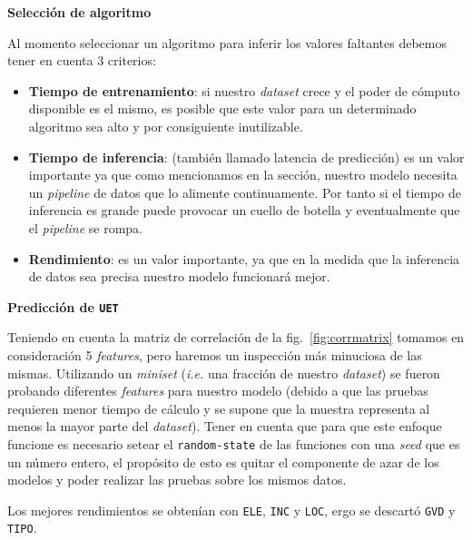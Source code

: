 \documentclass[a4paper,12pt]{article}
\begin{document}
		\hfill
						
		\textbf{Selección de algoritmo}
						
		Al momento seleccionar un algoritmo para inferir los valores faltantes debemos tener en cuenta 3 criterios:
		\begin{itemize}
			\item \textbf{Tiempo de entrenamiento}: si nuestro \textit{dataset} crece y el poder de cómputo disponible es el mismo, es posible que este valor para un determinado algoritmo sea alto y por consiguiente inutilizable.
			\item \textbf{Tiempo de inferencia}: (también llamado latencia de predicción) es un valor importante ya que como mencionamos en la sección, nuestro modelo necesita un \textit{pipeline} de datos que lo alimente continuamente. Por tanto si el tiempo de inferencia es grande puede provocar un cuello de botella y eventualmente que el \textit{pipeline} se rompa.
			\item \textbf{Rendimiento}: es un valor importante, ya que en la medida que la inferencia de datos sea precisa nuestro modelo funcionará mejor.
		\end{itemize}
						
		\textbf{Predicción de \texttt{UET}}
						
		Teniendo en cuenta la matriz de correlación de la fig.~\ref{fig:corrmatrix} tomamos en consideración 5 \textit{features}, pero haremos un inspección más minuciosa de las mismas. Utilizando un \textit{miniset} (\textit{i.e.} una fracción de nuestro \textit{dataset}) se fueron probando diferentes \textit{features} para nuestro modelo (debido a que las pruebas requieren menor tiempo de cálculo y se supone que la muestra representa al menos la mayor parte del \textit{dataset}). Tener en cuenta que para que este enfoque funcione es necesario setear el \texttt{random-state} de las funciones con una \textit{seed} que es un número entero, el propósito de esto es quitar el componente de azar de los modelos y poder realizar las pruebas sobre los mismos datos.
						
		Los mejores rendimientos se obtenían con \texttt{ELE}, \texttt{INC} y \texttt{LOC}, ergo se descartó \texttt{GVD} y \texttt{TIPO}.
						
\end{document}
